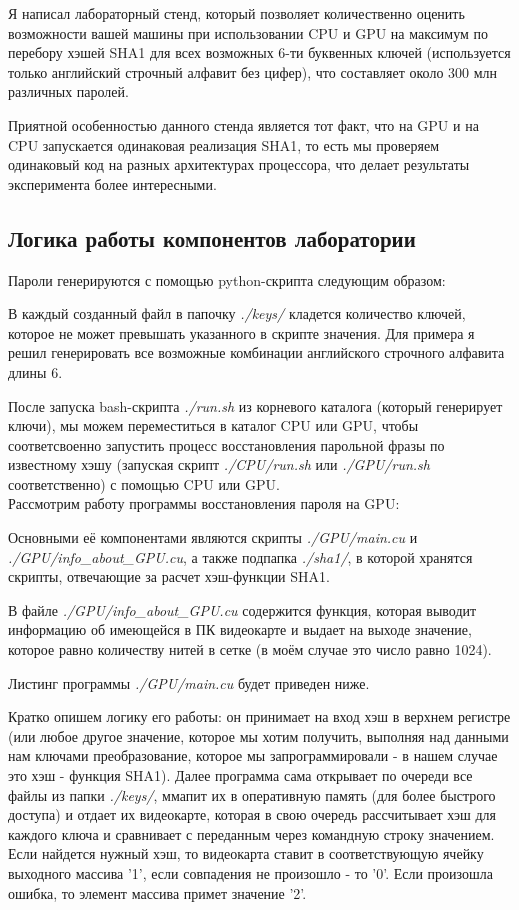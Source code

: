 \documentclass[12pt,a4paper]{scrartcl}
\begin{document}
Я написал лабораторный стенд, который позволяет количественно оценить возможности вашей машины при использовании CPU и GPU на максимум по перебору хэшей SHA1 для всех возможных 6-ти буквенных ключей (используется только английский строчный алфавит без цифер), что составляет около 300 млн различных паролей. 

Приятной особенностью данного стенда является тот факт, что на GPU и на CPU запускается одинаковая реализация SHA1, то есть мы проверяем одинаковый код на разных архитектурах процессора, что делает результаты эксперимента более интересными.


\subsection{Логика работы компонентов лаборатории}

Пароли генерируются с помощью python-скрипта следующим образом: 

В каждый созданный файл в папочку \textit{./keys/} кладется количество ключей, которое не может превышать указанного в скрипте значения. Для примера я решил генерировать все возможные комбинации английского строчного алфавита длины 6.

После запуска bash-скрипта \textit{./run.sh} из корневого каталога (который генерирует ключи), мы можем переместиться в каталог CPU или GPU, чтобы соответсвоенно запустить процесс восстановления парольной фразы по известному хэшу (запуская скрипт \textit{./CPU/run.sh} или \textit{./GPU/run.sh} соответственно) с помощью CPU или GPU.\\

Рассмотрим работу программы восстановления пароля на GPU:

Основными её компонентами являются скрипты \textit{./GPU/main.cu} и  \textit{./GPU/info\_about\_GPU.cu}, а также подпапка \textit{./sha1/}, в которой хранятся скрипты, отвечающие за расчет хэш-функции SHA1.

В файле \textit{./GPU/info\_about\_GPU.cu} содержится функция, которая выводит информацию об имеющейся в ПК видеокарте и выдает на выходе значение, которое равно количеству нитей в сетке (в моём случае это число равно 1024).

Листинг программы \textit{./GPU/main.cu} будет приведен ниже.

Кратко опишем логику его работы:
он принимает на вход хэш в верхнем регистре (или любое другое значение, которое мы хотим получить, выполняя над данными нам ключами преобразование, которое мы запрограммировали - в нашем случае это хэш - функция SHA1). Далее программа сама открывает по очереди все файлы из папки \textit{./keys/}, ммапит их в оперативную память (для более быстрого доступа) и отдает их видеокарте, которая в свою очередь рассчитывает хэш для каждого ключа и сравнивает с переданным через командную строку значением. Если найдется нужный хэш, то видеокарта ставит в соответствующую ячейку выходного массива '1', если совпадения не произошло - то '0'. Если произошла ошибка, то элемент массива примет значение '2'. 
\end{document}
